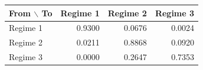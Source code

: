 \begin{tabular}{lrrr}
\toprule
From $\backslash$ To & Regime 1 & Regime 2 & Regime 3 \\
\midrule
Regime 1 & 0.9300 & 0.0676 & 0.0024 \\
Regime 2 & 0.0211 & 0.8868 & 0.0920 \\
Regime 3 & 0.0000 & 0.2647 & 0.7353 \\
\bottomrule
\end{tabular}

